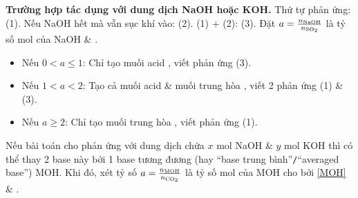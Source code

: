 \documentclass{article}
\begin{document}
\noindent\textbf{\textsf{Trường hợp  tác dụng với dung dịch NaOH hoặc KOH.}} Thứ tự phản ứng:  (1). Nếu NaOH hết mà vẫn sục khí  vào:  (2). (1) $+$ (2):  (3). Đặt $a = \frac{n_{\rm NaOH}}{n_{\ce{SO2}}}$ là tỷ số mol của NaOH \& .
\begin{itemize}
	\item Nếu $0 < a\le 1$: Chỉ tạo muối acid , viết phản ứng (3).
	\item Nếu $1 < a < 2$: Tạo cả muối acid  \& muối trung hòa , viết 2 phản ứng (1) \& (3).
	\item Nếu $a\ge 2$: Chỉ tạo muối trung hòa , viết phản ứng (1).
\end{itemize}
Nếu bài toán cho  phản ứng với dung dịch chứa $x$ mol NaOH \& $y$ mol KOH thì có thể thay 2 base này bởi 1 base tương đương (hay ``base trung bình''{\tt/}``averaged base'') MOH. Khi đó, xét tỷ số $a = \frac{n_{\rm MOH}}{n_{\ce{CO2}}}$ là tỷ số mol của MOH cho bởi \eqref{MOH} \& .

\end{document}
